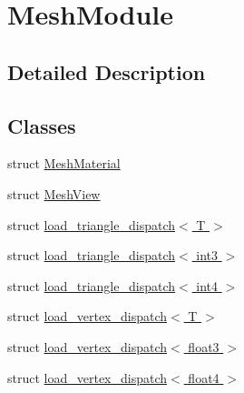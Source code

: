 \hypertarget{group___mesh_module}{}\section{Mesh\+Module}
\label{group___mesh_module}


\subsection{Detailed Description}
\subsection*{Classes}
\begin{DoxyCompactItemize}
\item 
struct \hyperlink{struct_mesh_material}{Mesh\+Material}
\item 
struct \hyperlink{struct_mesh_view}{Mesh\+View}
\item 
struct \hyperlink{structload__triangle__dispatch}{load\+\_\+triangle\+\_\+dispatch$<$ T $>$}
\item 
struct \hyperlink{structload__triangle__dispatch_3_01int3_01_4}{load\+\_\+triangle\+\_\+dispatch$<$ int3 $>$}
\item 
struct \hyperlink{structload__triangle__dispatch_3_01int4_01_4}{load\+\_\+triangle\+\_\+dispatch$<$ int4 $>$}
\item 
struct \hyperlink{structload__vertex__dispatch}{load\+\_\+vertex\+\_\+dispatch$<$ T $>$}
\item 
struct \hyperlink{structload__vertex__dispatch_3_01float3_01_4}{load\+\_\+vertex\+\_\+dispatch$<$ float3 $>$}
\item 
struct \hyperlink{structload__vertex__dispatch_3_01float4_01_4}{load\+\_\+vertex\+\_\+dispatch$<$ float4 $>$}
\end{DoxyCompactItemize}
